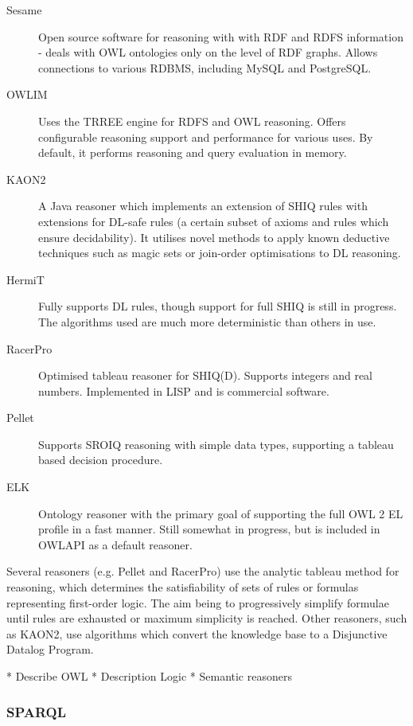 \documentclass{article}
\begin{document}
\begin{description}
    \item[Sesame] Open source software for reasoning with with RDF and RDFS
    information - deals with OWL ontologies only on the level of RDF graphs.
    Allows connections to various RDBMS, including MySQL and PostgreSQL.
    \item[OWLIM] Uses the TRREE engine for RDFS and OWL reasoning. Offers
    configurable reasoning support and performance for various uses. By default,
    it performs reasoning and query evaluation in memory.
    \item[KAON2] A Java reasoner which implements an extension of SHIQ rules with
    extensions for DL-safe rules (a certain subset of axioms and rules which
    ensure decidability). It utilises novel methods to apply known
    deductive techniques such as magic sets or join-order optimisations
    to DL reasoning.
    \item[HermiT] Fully supports DL rules, though support for full SHIQ is still
    in progress. The algorithms used are much more deterministic than others in
    use.
    \item[RacerPro] Optimised tableau reasoner for SHIQ(D). Supports integers
    and real numbers. Implemented in LISP and is commercial software.
    \item[Pellet] Supports SROIQ reasoning with simple data types, supporting a
    tableau based decision procedure. 
    \item[ELK] Ontology reasoner with the primary goal of supporting the full
    OWL 2 EL profile in a fast manner. Still somewhat in progress, but is included
    in OWLAPI as a default reasoner. 
\end{description}

Several reasoners (e.g. Pellet and RacerPro) use the analytic tableau method for
reasoning, which determines the satisfiability of sets of rules or formulas
representing first-order logic. The aim being to progressively simplify formulae
until rules are exhausted or maximum simplicity is reached. Other reasoners,
such as KAON2, use algorithms which convert the knowledge base to a Disjunctive
Datalog Program.\cite{ddp}

* Describe OWL
* Description Logic
* Semantic reasoners

\subsubsection{SPARQL}
\end{document}
